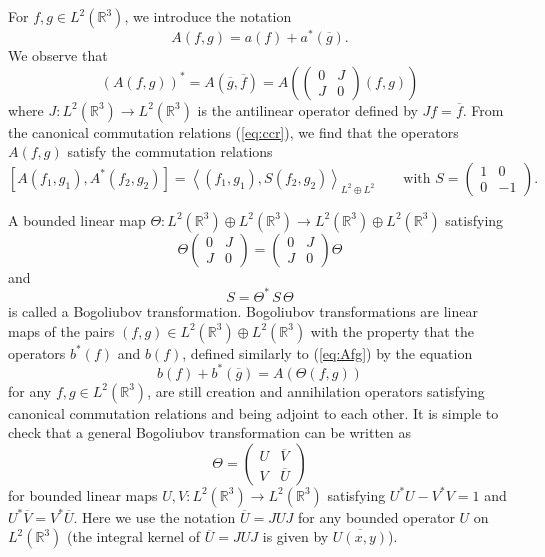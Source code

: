 \documentclass[11pt,a4paper]{article}
\newcommand{\done}{}
\newcommand{\bR}{{\mathbb R}}
\begin{document}
For $f,g \in L^2 (\bR^3)$, we introduce the notation
\begin{equation}\label{eq:Afg} A(f,g) = a(f) + a^* (\overline{g}). \end{equation}
We observe that 
\begin{equation}\label{eq:bog11} 
(A(f,g))^* = A(\overline{g}, \overline{f}) = A \left( \left( \begin{array}{ll} 0 & J \\ J & 0 \end{array} \right) (f,g) \right)\end{equation}
where $J:L^2 (\bR^3) \to L^2 (\bR^3)$ is the antilinear operator defined by $Jf = \overline{f}$. {F}rom the canonical commutation relations (\ref{eq:ccr}), we find that the operators $A(f,g)$ satisfy the commutation relations
\begin{equation}\label{eq:bog22} \left[ A(f_1, g_1) , A^* (f_2, g_2) \right] = \left\langle (f_1, g_1) , S (f_2, g_2) \right\rangle_{L^2 \oplus L^2} \qquad \text{with } S = \left( \begin{array}{ll} 1 & 0 \\ 0 & -1 \end{array} \right). \end{equation}

A bounded linear map $\Theta : L^2 (\bR^3) \oplus L^2 (\bR^3) \to L^2 (\bR^3) \oplus L^2 (\bR^3)$ satisfying
\begin{equation}\label{eq:bog1}
\Theta \left( \begin{array}{ll} 0 & J \\ J & 0 \end{array} \right) = \left( \begin{array}{ll} 0 & J \\ J & 0 \end{array} \right) \Theta \end{equation}
and
\begin{equation}\label{eq:bog2} S = \Theta^* \, S \, \Theta \end{equation}
is called a Bogoliubov transformation. Bogoliubov transformations are linear maps of the pairs $(f,g) \in L^2 (\bR^3) \oplus L^2 (\bR^3)$ with the property that the operators $b^* (f)$ and $b(f)$,\done{} defined similarly to (\ref{eq:Afg}) by the equation \[ b (f) + b^* (\overline{g}) = A (\Theta (f,g)) \] for any $f,g \in L^2 (\bR^3)$, are still creation and annihilation operators satisfying canonical commutation relations and being adjoint to each other. It is simple to check that a general Bogoliubov transformation can be written as  
\begin{equation}\label{eq:theta-UV} \Theta = \left( \begin{array}{ll} U &  \overline{V}  \\ V & \overline{U} \end{array} \right) \end{equation}
for bounded linear maps $U, V: L^2 (\bR^3) \to L^2 (\bR^3)$ satisfying $U^* U - V^* V = 1$ and $U^* \overline{V} = V^*\overline{U}$. Here we use the notation $\overline{U} = J U J$ for any bounded operator $U$ on $L^2 (\bR^3)$ (the integral kernel of $\overline{U} = J U J$ is given by $\overline{U(x,y)}$). 
\end{document}
